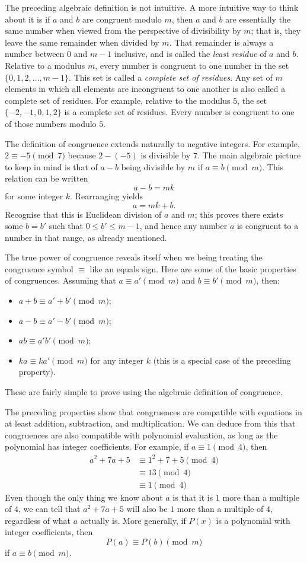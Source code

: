 The preceding algebraic definition is not intuitive. A more intuitive way to think
about it is if \(a\) and \(b\) are congruent modulo \(m\), then \(a\) and \(b\)
are essentially the same number when viewed from the perspective of divisibility by \(m\);
that is, they leave the same remainder when divided by \(m\). That remainder is always
a number between \(0\) and \(m-1\) inclusive, and is called the \emph{least residue} of \(a\)
and \(b\). Relative to a modulus \(m\), every number is congruent to one number
in the set \(\{0,1,2,\ldots,m-1\}\). This set is called a \emph{complete set of residues}.
Any set of \(m\) elements in which all elements are incongruent to one another is also called
a complete set of residues. For example, relative to the modulus \(5\), the set \(\{-2,-1,0,1,2\}\)
is a complete set of residues. Every number is congruent to one of those numbers modulo \(5\).

The definition of congruence extends naturally to negative integers. For example, \(2\equiv-5\pmod{7}\)
because \(2-(-5)\) is divisible by \(7\). The main algebraic picture to keep in mind
is that of $a-b$ being divisible by $m$ if $a\equiv b\pmod{m}$. This relation can be written
\[a-b=mk\] for some integer $k$. Rearranging yields \[a=mk+b.\] Recognise that this
is Euclidean division of $a$ and $m$; this proves there exists some $b=b'$ such that $0\le b'\le m-1$,
and hence any number $a$ is congruent to a number in that range, as already mentioned.

The true power of congruence reveals itself when we being treating the congruence symbol $\equiv$
like an equals sign. Here are some of the basic properties of congruences. Assuming
that $a\equiv a'\pmod{m}$ and $b\equiv b'\pmod{m}$, then:
\begin{itemize}
\item $a+b\equiv a'+b'\pmod{m}$;
\item $a-b\equiv a'-b'\pmod{m}$;
\item $ab\equiv a'b'\pmod{m}$;
\item $ka\equiv ka'\pmod{m}$ for any integer $k$ (this is a special case of the preceding property).
\end{itemize}
These are fairly simple to prove using the algebraic definition of congruence.

The preceding properties show that congruences are compatible with equations
in at least addition, subtraction, and multiplication. We can deduce from this
that congruences are also compatible with polynomial evaluation, as long as the polynomial
has integer coefficients. For example, if $a\equiv1\pmod{4}$, then
\[
  \begin{split}
    a^2+7a+5&\equiv1^2+7+5\pmod{4}\\
            &\equiv13\pmod{4}\\
            &\equiv1\pmod{4}
  \end{split}
\]
Even though the only thing we know about $a$ is that it is $1$ more than a multiple of $4$, we
can tell that $a^2+7a+5$ will also be $1$ more than a multiple of $4$, regardless of what $a$ actually is.
More generally, if $P(x)$ is a polynomial with integer coefficients, then \[P(a)\equiv P(b)\pmod{m}\]
if \(a\equiv b\pmod{m}\).


